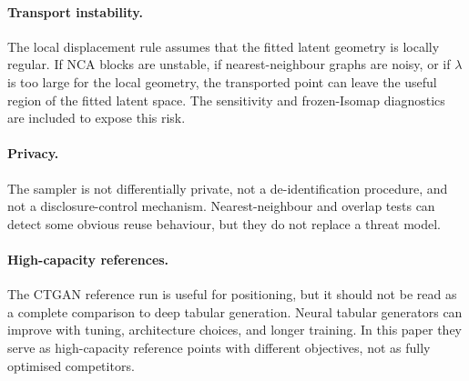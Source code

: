 \paragraph{Transport instability.}
The local displacement rule assumes that the fitted latent geometry is locally
regular. If NCA blocks are unstable, if nearest-neighbour graphs are noisy, or
if $\lambda$ is too large for the local geometry, the transported point can
leave the useful region of the fitted latent space. The sensitivity and
frozen-Isomap diagnostics are included to expose this risk.

\paragraph{Privacy.}
The sampler is not differentially private, not a de-identification procedure,
and not a disclosure-control mechanism. Nearest-neighbour and overlap tests can
detect some obvious reuse behaviour, but they do not replace a threat model.

\paragraph{High-capacity references.}
The CTGAN reference run is useful for positioning, but it should not be read as
a complete comparison to deep tabular generation. Neural tabular generators
can improve with tuning, architecture choices, and longer training. In this
paper they serve as high-capacity reference points with different objectives,
not as fully optimised competitors.


